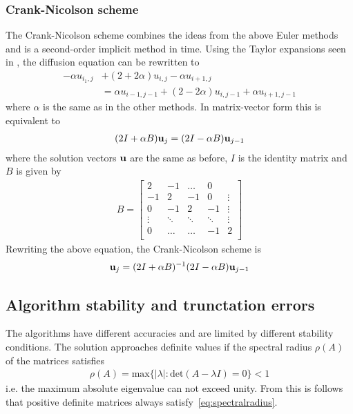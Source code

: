 \documentclass[aps,reprint]{revtex4-1}
\begin{document}
\subsubsection{Crank-Nicolson scheme}
The Crank-Nicolson scheme combines the ideas from the above Euler methods and is
a second-order implicit method in time. Using the Taylor expansions seen in
\cite{mortenjensen}, the diffusion equation can be rewritten to
\begin{align*}
  -\alpha u_{i_1, j} &+ (2 + 2\alpha) u_{i,j} - \alpha u_{i+1,j}\\
   &= \alpha u_{i-1,j-1} + (2 - 2\alpha) u_{i, j-1} + \alpha u_{i+1,j-1}
\end{align*}
where $\alpha$ is the same as in the other methods. In matrix-vector form this
is equivalent to
\begin{align*}
  (2 I + \alpha B) \vb{u}_j = (2 I - \alpha B) \vb{u}_{j-1}
\end{align*}
where the solution vectors $\vb{u}$ are the same as before, $I$ is the identity
matrix and $B$ is given by
\begin{align*}
  B = \begin{bmatrix}
        2  & -1 & \hdots  & 0      \\
        -1 & 2  & -1 & 0       & \vdots \\
        0  & -1 & 2  & -1  & \vdots \\
        \vdots       & \ddots      & \ddots       & \ddots  & \vdots \\
        0  & \hdots  & \hdots       & -1  & 2 \\
      \end{bmatrix}
\end{align*}
Rewriting the above equation, the Crank-Nicolson scheme is
\begin{align*}
  \vb{u}_j = (2 I + \alpha B)^{-1} (2 I - \alpha B) \vb{u}_{j-1}
\end{align*}
\subsection{Algorithm stability and trunctation errors}
The algorithms have different accuracies and are limited by different stability
conditions. The solution approaches definite values if the spectral radius $\rho(A)$ of
the matrices satisfies
\begin{align} \label{eq:spectralradius}
  \rho(A) = \text{max}\{ |\lambda| : \text{det}(A - \lambda I) = 0 \} < 1
\end{align}
i.e. the maximum absolute eigenvalue can not exceed unity. From this is follows
that positive definite matrices always satisfy~\ref{eq:spectralradius}.
\end{document}

